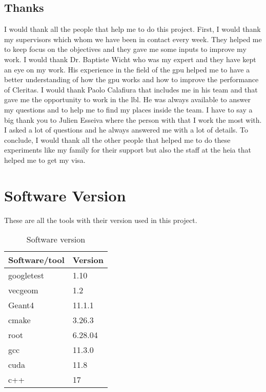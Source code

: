 \section{Thanks}
\label{ch:acknowledgements:thanks}

I would thank all the people that help me to do this project.
First, I would thank my supervisors which whom we have been in contact every week.
They helped me to keep focus on the objectives and they gave me some inputs to
improve my work.
I would thank Dr. Baptiste Wicht who was my expert and they have kept an eye
on my work.
His experience in the field of the \acrshort{gpu} helped me to have a better
understanding of how the \acrshort{gpu} works and how to improve the performance
of Cleritas.
I would thank Paolo Calafiura that includes me in his team and that gave me the
opportunity to work in the \acrshort{lbl}.
He was always available to answer my questions and to help me to find my places
inside the team.
I have to say a big thank you to Julien Esseiva where the person with that I work
the most with.
I asked a lot of questions and he always answered me with a lot of details.
To conclude, I would thank all the other people that helped me to do these
experiments like my family for their support but also the staff at the \acrshort{heia}
that helped me to get my visa.

\chapter{Software Version}
\label{ch:software}
These are all the tools with their version used in this project.

\begin{table}[ht]
    \centering
    \begin{tabular}{|l|l|}
        \hline
        \textbf{Software/tool} & \textbf{Version} \\
        \hline
        googletest & 1.10 \\
        \hline
        vecgeom & 1.2 \\
        \hline
        Geant4 & 11.1.1 \\
        \hline
        cmake & 3.26.3 \\
        \hline
        root & 6.28.04 \\
        \hline
        gcc & 11.3.0 \\
        \hline
        cuda & 11.8 \\
        \hline
        c++ & 17 \\
        \hline
    \end{tabular}
    \caption{Software version}
    \label{tab:softwareVersion}
\end{table}